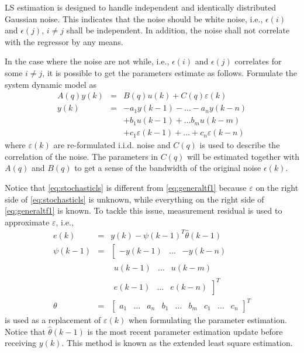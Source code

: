 LS estimation is designed to handle independent and identically distributed Gaussian noise. This indicates that the noise should be white noise, i.e., $\epsilon(i)$ and $\epsilon(j)$, $i\neq j$ shall be independent. In addition, the noise shall not correlate with the regressor by any means.

In the case where the noise are not while, i.e., $\epsilon(i)$ and $\epsilon(j)$ correlates for some $i \neq j$, it is possible to get the parameters estimate as follows. Formulate the system dynamic model as
\begin{eqnarray}
  A(q)y(k) &=& B(q)u(k) + C(q)\varepsilon(k) \nonumber \\
  y(k) &=& -a_1y(k-1) - \ldots - a_ny(k-n) \nonumber \\ && + b_1u(k-1) + \ldots b_mu(k-m) \nonumber \\ && + c_1\varepsilon(k-1) + \ldots + c_n\varepsilon(k-n) \label{eq:stochasticls}
\end{eqnarray}
where $\varepsilon(k)$ are re-formulated i.i.d. noise and $C(q)$ is used to describe the correlation of the noise. The parameters in $C(q)$ will be estimated together with $A(q)$ and $B(q)$ to get a sense of the bandwidth of the original noise $\epsilon(k)$.

Notice that \eqref{eq:stochasticls} is different from \eqref{eq:generaltf1} because $\varepsilon$ on the right side of \eqref{eq:stochasticls} is unknown, while everything on the right side of \eqref{eq:generaltf1} is known. To tackle this issue, measurement residual is used to approximate $\varepsilon$, i.e.,
\begin{eqnarray}
  e(k) &=& y(k) - \psi(k-1)^T\hat{\theta}(k-1) \label{eq:els1} \\
  \psi(k-1) &=& \left[\begin{array}{ccc}
                          -y(k-1) & \ldots & -y(k-n)
                        \end{array}\right. \nonumber \\
              & & \left.\begin{array}{ccc}
                          u(k-1) & \ldots & u(k-m)
                        \end{array}\right. \nonumber \\
              & & \left.\begin{array}{ccc}
                          e(k-1) & \ldots & e(k-n)
                        \end{array}\right]^T \nonumber \\
  \theta &=& \left[\begin{array}{ccccccccc}
                   a_1 & \ldots & a_n & b_1 & \ldots & b_m & c_1 & \ldots & c_n
                 \end{array}\right]^T \nonumber
\end{eqnarray}
is used as a replacement of $\varepsilon(k)$ when formulating the parameter estimation. Notice that $\hat{\theta}(k-1)$ is the most recent parameter estimation update before receiving $y(k)$. This method is known as the extended least square estimation.

